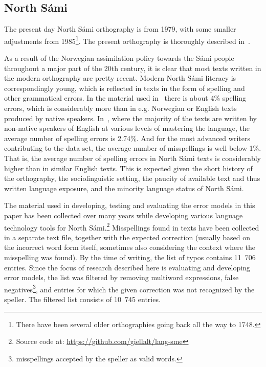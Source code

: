\documentclass{flammie}
\begin{document}
\subsection{North Sámi}

The present day North Sámi orthography is from 1979, with some smaller
adjustments from 1985\footnote{There have been several older orthographies going
back all the way to 1748.}. The present orthography is thoroughly described
in~\cite{ref_Nic}.

As a result of the Norwegian assimilation policy towards the Sámi people
throughout a major part of the 20th century, it is clear that most texts written
in the modern orthography are pretty recent. Modern North Sámi literacy is
correspondingly young, which is reflected in texts in the form of spelling and
other grammatical errors. In the material used in~\cite{antonsen2013} there is
about 4\% spelling errors, which is considerably more than in e.g. Norwegian or
English texts produced by native speakers. In~\cite{flor_futagi_2015}, where
the majority of the texts are written by non-native speakers of English at
various levels of mastering the language, the average number of spelling errors
is 2.74\%. And for the most advanced writers contributing to the data set, the
average number of misspellings is well below 1\%. That is, the average number of
spelling errors in North Sámi texts is considerably higher than in similar
English texts. This is expected given the short history of the orthography, the
sociolinguistic setting, the paucity of available text and thus written language
exposure, and the minority language status of North Sámi.

The material used in developing, testing and evaluating the error models in this
paper has been collected over many years while developing various language
technology tools for North Sámi.\footnote{Source code at:
\url{https://github.com/giellalt/lang-sme}} Misspellings found in texts have
been collected in a separate text file, together with the expected correction
(usually based on the incorrect word form itself, sometimes also considering the
context where the misspelling was found). By the time of writing, the list of
typos contains 11~706 entries. Since the focus of research described here is
evaluating and developing error models, the list was filtered by removing
multiword expressions, false negatives\footnote{misspellings accepted by the
speller as valid words.}, and entries for which the given correction was not
recognized by the speller. The filtered list consists of 10~745 entries.
\end{document}
